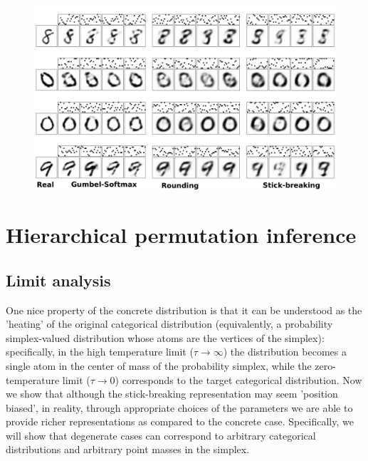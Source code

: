\documentclass{article}
\begin{document}
\begin{figure}[t]
  \centering
  \includegraphics[width=5.in]{../figures/figure4.pdf} 
  \caption{
  }
\label{fig:transforms}
\end{figure}

\label{sec:vae}

\section{Hierarchical permutation inference}
\label{sec:synth_celegans}






\appendix
\subsection{Limit analysis}

One nice property of the concrete distribution \citep{maddison2016concrete, jang2016categorical} is that it can be understood as the 'heating' of the original categorical distribution (equivalently, a probability simplex-valued distribution whose atoms are the vertices of the simplex): specifically, in the high temperature limit ($\tau \rightarrow \infty$) the distribution becomes a single atom in the center of mass of the probability simplex, while the zero-temperature limit ($\tau\rightarrow 0$) corresponds to the target categorical distribution. Now we show that although the stick-breaking representation may seem 'position biased', in reality, through appropriate choices of the parameters we are able to provide richer representations as compared to the concrete case. Specifically, we will show that degenerate cases can correspond to arbitrary categorical distributions and arbitrary point masses in the simplex.
\end{document}
